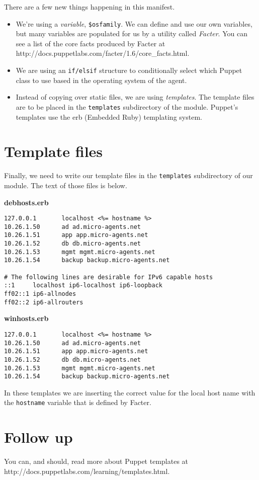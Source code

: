 \documentclass{article}   	%
\begin{document}
\newpage

There are a few new things happening in this manifest.
\begin{itemize}
  \item We're using a \emph{variable}, \texttt{\$osfamily}.  We can define and use our own variables, but many variables are populated for us by a utility called \emph{Facter}.  You can see a list of the core facts produced by Facter at \\ http://docs.puppetlabs.com/facter/1.6/core\_facts.html.
  \item We are using an \texttt{if/elsif} structure to conditionally select which Puppet class to use based in the operating system of the agent.
  \item Instead of copying over static files, we are using \emph{templates}.  The template files are to be placed in the \texttt{templates} subdirectory of the module.  Puppet's templates use the erb (Embedded Ruby) templating system.
\end{itemize}

\section{Template files}
Finally, we need to write our template files in the \texttt{templates} subdirectory of our module.  The text of those files is below.

\textbf{debhosts.erb}
\begin{verbatim}
127.0.0.1       localhost <%= hostname %>
10.26.1.50      ad ad.micro-agents.net
10.26.1.51      app app.micro-agents.net
10.26.1.52      db db.micro-agents.net
10.26.1.53      mgmt mgmt.micro-agents.net
10.26.1.54      backup backup.micro-agents.net

# The following lines are desirable for IPv6 capable hosts
::1     localhost ip6-localhost ip6-loopback
ff02::1 ip6-allnodes
ff02::2 ip6-allrouters
\end{verbatim}


\textbf{winhosts.erb}
\begin{verbatim}
127.0.0.1       localhost <%= hostname %>
10.26.1.50      ad ad.micro-agents.net
10.26.1.51      app app.micro-agents.net
10.26.1.52      db db.micro-agents.net
10.26.1.53      mgmt mgmt.micro-agents.net
10.26.1.54      backup backup.micro-agents.net

\end{verbatim}

In these templates we are inserting the correct value for the local host name with the \texttt{hostname} variable that is defined by Facter.

\section{Follow up}
You can, and should, read more about Puppet templates at http://docs.puppetlabs.com/learning/templates.html.
\end{document}
